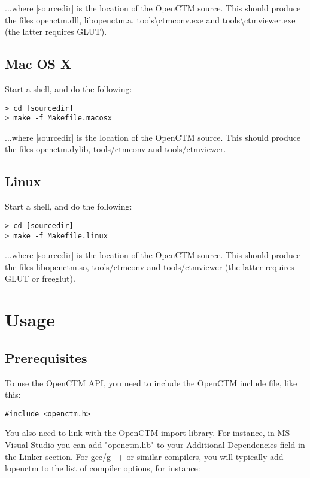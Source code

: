 ...where [sourcedir] is the location of the OpenCTM source. This should produce
the files openctm.dll, libopenctm.a, tools\textbackslash ctmconv.exe and
tools\textbackslash ctmviewer.exe (the latter requires GLUT).


\section{Mac OS X}
Start a shell, and do the following:

\begin{lstlisting}
> cd [sourcedir]
> make -f Makefile.macosx
\end{lstlisting}

...where [sourcedir] is the location of the OpenCTM source. This should produce
the files openctm.dylib, tools/ctmconv and tools/ctmviewer.


\section{Linux}
Start a shell, and do the following:

\begin{lstlisting}
> cd [sourcedir]
> make -f Makefile.linux
\end{lstlisting}

...where [sourcedir] is the location of the OpenCTM source. This should produce
the files libopenctm.so, tools/ctmconv and tools/ctmviewer (the latter requires
GLUT or freeglut).




\chapter{Usage}

\section{Prerequisites}
To use the OpenCTM API, you need to include the OpenCTM include file, like this:

\begin{lstlisting}
#include <openctm.h>
\end{lstlisting}

You also need to link with the OpenCTM import library. For instance, in MS
Visual Studio you can add "openctm.lib" to your Additional Dependencies field
in the Linker section. For gcc/g++ or similar compilers, you will typically
add -lopenctm to the list of compiler options, for instance:


